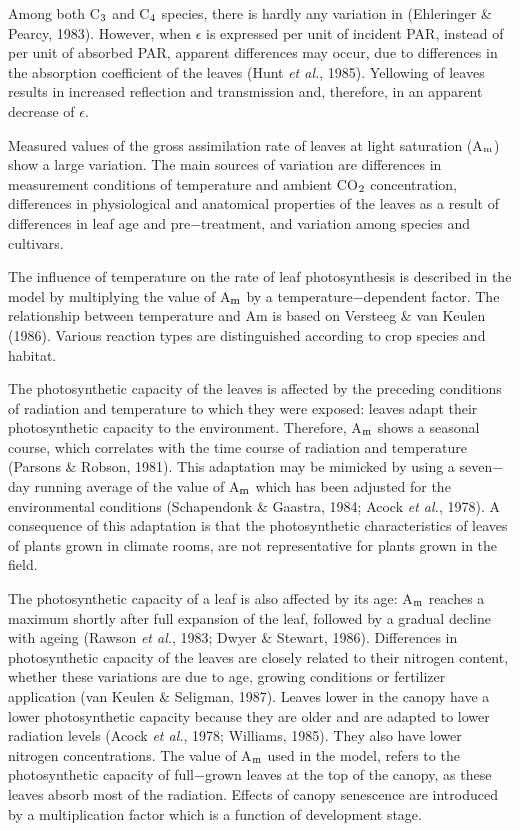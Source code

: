 Among both C$_{{\rm 3}}$ and C$_{{\rm 4}}$ species, there
is hardly any variation in (Ehleringer \& Pearcy, 1983). However, when $\epsilon$ is expressed per
unit of incident PAR, instead of per unit of absorbed PAR, apparent differences may
occur, due to differences in the absorption coefficient of the leaves (Hunt {\it et al.}, 1985).
Yellowing of leaves results in increased reflection and transmission and, therefore, in an
apparent decrease of $\epsilon$.  

Measured values of the gross assimilation rate of leaves at light saturation (A$_{{\rm m}}$) show a
large variation. The main sources of variation are differences in measurement conditions
of temperature and ambient CO$_{{\rm 2}}$ concentration, differences in physiological and 
anatomical properties of the leaves as a result of differences in leaf age and pre$-$treatment, and
variation among species and cultivars.

The influence of temperature on the rate of leaf photosynthesis is described in the model
by multiplying the value of A$_{{\rm m}}$ by a temperature$-$dependent factor. The relationship
between temperature and Am is based on Versteeg \& van Keulen (1986). Various
reaction types are distinguished according to crop species and habitat.

The photosynthetic capacity of the leaves is affected by the preceding conditions of
radiation and temperature to which they were exposed: leaves adapt their photosynthetic
capacity to the environment. Therefore, A$_{{\rm m}}$ shows a seasonal course, which correlates
with the time course of radiation and temperature (Parsons \& Robson, 1981). This
adaptation may be mimicked by using a seven$-$day running average of the value of A$_{{\rm m}}$
which has been adjusted for the environmental conditions (Schapendonk \& Gaastra, 1984;
Acock {\it et al.}, 1978). A consequence of this adaptation is that the photosynthetic 
characteristics of leaves of plants grown in climate rooms, are not representative for plants grown
in the field.

The photosynthetic capacity of a leaf is also affected by its age: A$_{{\rm m}}$ reaches a maximum
shortly after full expansion of the leaf, followed by a gradual decline with ageing
(Rawson {\it et al.}, 1983; Dwyer \& Stewart, 1986). Differences in photosynthetic capacity of
the leaves are closely related to their nitrogen content, whether these variations are due to
age, growing conditions or fertilizer application (van Keulen \& Seligman, 1987). Leaves 
lower in the canopy have a lower photosynthetic capacity because they are older and are
adapted to lower radiation levels (Acock {\it et al.}, 1978; Williams, 1985). They also have
lower nitrogen concentrations. The value of A$_{{\rm m}}$ used in the model, refers to the
photosynthetic capacity of full$-$grown leaves at the top of the canopy, as these leaves
absorb most of the radiation. Effects of canopy senescence are introduced by a multiplication 
factor which is a function of development stage.


